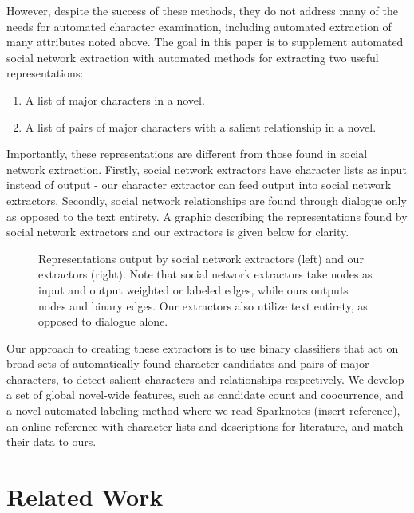 \documentclass[12pt]{article}
\begin{document}
However, despite the success of these methods, they do not address many of the needs for automated character examination, including automated extraction of many attributes noted above. The goal in this paper is to supplement automated social network extraction with automated methods for extracting two useful representations:  

\begin{enumerate}
    \setlength\itemsep{0em}
    \item A list of major characters in a novel. 
    \item A list of pairs of major characters with a salient relationship in a novel. 
\end{enumerate}

Importantly, these representations are different from those found in social network extraction. Firstly, social network extractors have character lists as input instead of output - our character extractor can feed output into social network extractors. Secondly, social network relationships are found through dialogue only as opposed to the text entirety. A graphic describing the representations found by social network extractors and our extractors is given below for clarity. 

\begin{figure}[H]
    \centering
    \caption{Representations output by social network extractors (left) and our extractors (right). Note that social network extractors take nodes as input and output weighted or labeled edges, while ours outputs nodes and binary edges. Our extractors also utilize text entirety, as opposed to dialogue alone.} 
\end{figure}

Our approach to creating these extractors is to use binary classifiers that act on broad sets of automatically-found character candidates and pairs of major characters, to detect salient characters and relationships respectively. We develop a set of global novel-wide features, such as candidate count and coocurrence, and a novel automated labeling method where we read Sparknotes (insert reference), an online reference with character lists and descriptions for literature, and match their data to ours. 


\section{Related Work}
\end{document}
